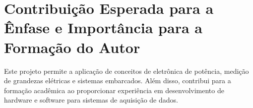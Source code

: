 \chapter{Contribuição Esperada para a Ênfase e Importância para a Formação do Autor} \label{cha:contribuicao}

Este projeto permite a aplicação de conceitos de eletrônica de potência, medição
de grandezas elétricas e sistemas embarcados. Além disso, contribui para a formação
acadêmica ao proporcionar experiência em desenvolvimento de hardware e software
para sistemas de aquisição de dados.
